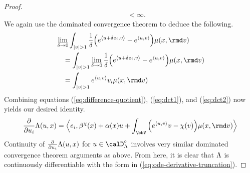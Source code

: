 \begin{proof}
\begin{align*}
    &\quad < \infty.
  \end{align*}
  We again use the dominated convergence theorem to deduce the following.
  \begin{align}
    &\lim_{\delta \rightarrow 0} \int_{|\markVar|> 1} \frac1\delta \Big( e^\prj{\momentVar+\delta \basisVec_i}{\markVar} - e^\prj{\momentVar}{\markVar} \Big) \affJump(\stateVar,\rmd\markVar) \notag \\
    &\quad= \int_{|\markVar|> 1} \lim_{\delta\rightarrow0} \frac{1}{\delta} \Big( e^\prj{\momentVar+\delta \basisVec_i}{\markVar} - e^\prj{\momentVar}{\markVar}  \Big) \affJump(\stateVar,\rmd\markVar) \notag \\
    \label{eq:dct2}
    &\quad= \int_{|\markVar|>1} e^\prj{\momentVar}{\markVar} \markVar_i  \affJump(\stateVar,\rmd\markVar)
  \end{align}
  Combining equations (\ref{eq:difference-quotient}), (\ref{eq:dct1}), and (\ref{eq:dct2}) now yields our desired identity.
  \begin{equation*}
    \frac{\partial}{\partial\momentVar_i} \ode(\momentVar,\stateVar)
    = \Bprj{\basisVec_i}{\affDrift^\trunc(\stateVar) + \affDiff(\stateVar)\momentVar + \int_\vecSpace \Big( e^\prj{\momentVar}{\markVar} \markVar - \trunc(\markVar) \Big) \affJump(\stateVar,\rmd\markVar)}
  \end{equation*}
  Continuity of $\frac{\partial}{\partial u_i} \Lambda(u, x)$ for $\momentVar \in \odeSpace^\circ$ involves very similar dominated convergence theorem arguments as above.
  From here, it is clear that $\Lambda$ is continuously differentiable with the form in (\ref{eq:ode-derivative-truncation}).
\end{proof}
